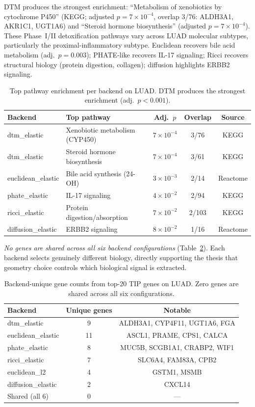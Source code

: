 \documentclass[12pt]{article}
\begin{document}
DTM produces the strongest enrichment: ``Metabolism of xenobiotics by cytochrome P450'' (KEGG; adjusted $p = 7 \times 10^{-4}$, overlap 3/76: ALDH3A1, AKR1C1, UGT1A6) and ``Steroid hormone biosynthesis'' (adjusted $p = 7 \times 10^{-4}$).
These Phase~I/II detoxification pathways vary across LUAD molecular subtypes, particularly the proximal-inflammatory subtype.
Euclidean recovers bile acid metabolism (adj.\ $p = 0.003$); PHATE-like recovers IL-17 signaling; Ricci recovers structural biology (protein digestion, collagen); diffusion highlights ERBB2 signaling.

\begin{table}[h]
\centering\small
\begin{tabular}{@{}llccc@{}}
\toprule
\textbf{Backend} & \textbf{Top pathway} & \textbf{Adj.\ $p$} & \textbf{Overlap} & \textbf{Source} \\
\midrule
dtm\_elastic & Xenobiotic metabolism (CYP450) & $7 \times 10^{-4}$ & 3/76 & KEGG \\
dtm\_elastic & Steroid hormone biosynthesis & $7 \times 10^{-4}$ & 3/61 & KEGG \\
euclidean\_elastic & Bile acid synthesis (24-OH) & $3 \times 10^{-3}$ & 2/14 & Reactome \\
phate\_elastic & IL-17 signaling & $4 \times 10^{-2}$ & 2/94 & KEGG \\
ricci\_elastic & Protein digestion/absorption & $7 \times 10^{-2}$ & 2/103 & KEGG \\
diffusion\_elastic & ERBB2 signaling & $8 \times 10^{-2}$ & 1/16 & Reactome \\
\bottomrule
\end{tabular}
\caption{Top pathway enrichment per backend on LUAD. DTM produces the strongest enrichment (adj.\ $p < 0.001$).}
\label{tab:enrichment}
\end{table}

\emph{No genes are shared across all six backend configurations} (Table~\ref{tab:geneoverlap}).
Each backend selects genuinely different biology, directly supporting the thesis that geometry choice controls which biological signal is extracted.

\begin{table}[h]
\centering\small
\begin{tabular}{lcc}
\toprule
\textbf{Backend} & \textbf{Unique genes} & \textbf{Notable} \\
\midrule
dtm\_elastic & 9 & ALDH3A1, CYP4F11, UGT1A6, FGA \\
euclidean\_elastic & 11 & ASCL1, PRAME, CPS1, CALCA \\
phate\_elastic & 8 & MUC5B, SCGB1A1, CRABP2, WIF1 \\
ricci\_elastic & 7 & SLC6A4, FAM83A, CPB2 \\
euclidean\_l2 & 4 & GSTM1, MSMB \\
diffusion\_elastic & 2 & CXCL14 \\
\midrule
Shared (all 6) & 0 & --- \\
\bottomrule
\end{tabular}
\caption{Backend-unique gene counts from top-20 TIP genes on LUAD. Zero genes are shared across all six configurations.}
\label{tab:geneoverlap}
\end{table}
\end{document}
